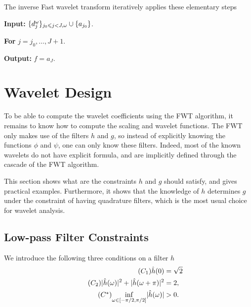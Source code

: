 
The inverse Fast wavelet transform iteratively applies these elementary steps
\begin{rs}
	\item \textbf{Input:} $\{ d_j^\omega \}_{j_0 \leqslant j < J, \omega} \cup \{ a_{j_0} \}$.
	\item \textbf{For} $j=j_0, \ldots, J+1$.
	\item \textbf{Output:} $f = a_J$.
\end{rs}




\section{Wavelet Design}

To be able to compute the wavelet coefficients using the FWT algorithm, it remains to know how to compute the scaling and wavelet functions. The FWT only makes use of the filters $h$ and $g$, so instead of explicitly knowing the functions $\phi$ and $\psi$, one can only know these filters. Indeed, most of the known wavelets do not have explicit formula, and are implicitly defined through the cascade of the FWT algorithm. 

This section shows what are the constraints $h$ and $g$ should satisfy, and gives practical examples. Furthermore, it shows that the knowledge of $h$ determines $g$ under the constraint of having quadrature filters, which is the most usual choice for wavelet analysis.


\subsection{Low-pass Filter Constraints}

We introduce the following three conditions on a filter $h$
\begin{align}
	\label{eq-cond-h-1}\tag{$C_1$}  \hat h(0)&=\sqrt{2}  \\
	\label{eq-cond-h-2}\tag{$C_2$}   |\hat h(\omega)|^2 + |\hat h(\omega+\pi)|^2&=2, \\
	\label{eq-cond-h-star}\tag{$C^*$}  \underset{\omega \in [-\pi/2,\pi/2]}{\inf} |\hat h(\omega)|&>0.
\end{align}

